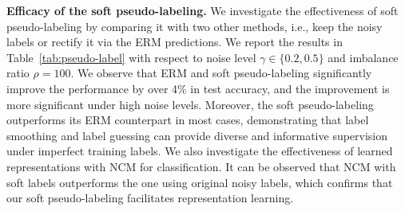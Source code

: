 \documentclass{article}
\begin{document}
\textbf{Efficacy of the soft pseudo-labeling.}
We investigate the effectiveness of soft pseudo-labeling by comparing it with two other methods, i.e., keep the noisy labels or rectify it via the ERM predictions. We report the results in Table~\ref{tab:pseudo-label} with respect to noise level $\gamma \in \{0.2, 0.5\}$ and imbalance ratio $\rho = 100$. We observe that ERM and soft pseudo-labeling significantly improve the performance by over 4\% in test accuracy, and the improvement is more significant under high noise levels. Moreover, the soft pseudo-labeling outperforms its ERM counterpart in most cases, demonstrating that label smoothing and label guessing can provide diverse and informative supervision under imperfect training labels. We also investigate the effectiveness of learned representations with NCM for classification. It can be observed that NCM with soft labels outperforms the one using original noisy labels, which confirms that our soft pseudo-labeling facilitates representation learning.
\end{document}
